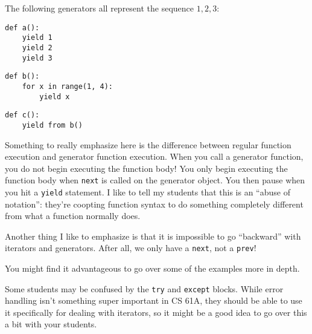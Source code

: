 The following generators all represent the sequence $1,2,3$: 

\begin{minipage}[t]{0.2\textwidth}
\begin{lstlisting}
def a():
    yield 1
    yield 2
    yield 3
\end{lstlisting}
\end{minipage}
\begin{minipage}[t]{0.4\textwidth}
\begin{lstlisting}
def b():
    for x in range(1, 4):
        yield x
\end{lstlisting}
\end{minipage}
\begin{minipage}[t]{0.4\textwidth}
\begin{lstlisting}
def c():
    yield from b()
\end{lstlisting}
\end{minipage}

\begin{meta}
Something to really emphasize here is the difference between regular function execution and generator function execution. When you call a generator function, you do not begin executing the function body! You only begin executing the function body when \lstinline{next} is called on the generator object. You then pause when you hit a \lstinline{yield} statement. I like to tell my students that this is an ``abuse of notation'': they're coopting function syntax to do something completely different from what a function normally does. 

Another thing I like to emphasize is that it is impossible to go ``backward'' with iterators and generators. After all, we only have a \lstinline{next}, not a \lstinline{prev}!

You might find it advantageous to go over some of the examples more in depth. 

Some students may be confused by the \lstinline{try} and \lstinline{except} blocks. While error handling isn't something super important in CS 61A, they should be able to use it specifically for dealing with iterators, so it might be a good idea to go over this a bit with your students. 
\end{meta}